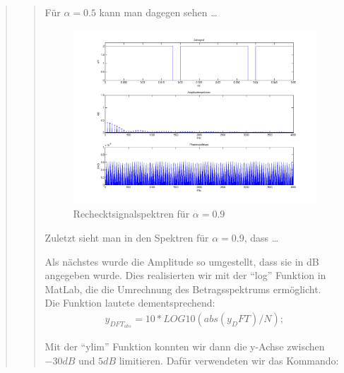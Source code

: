 \begin{quote}
\begin{quote}
		Für $\alpha = 0.5$ kann man dagegen sehen \ldots
		
		
		\begin{center}
	           \begin{figure}[H]
    			\centering
    				\includegraphics[scale=0.5]{recht_alpha9.png}
    			\caption{Rechecktsignalspektren für $\alpha = 0.9$}		
    			\end{figure}
		\end{center}
		
		Zuletzt sieht man in den Spektren für $\alpha = 0.9$, dass \ldots
		
		\vspace{1em}
		
		Als nächstes wurde die Amplitude so umgestellt, dass sie in dB angegeben
		wurde. Dies realisierten wir mit der ``log'' Funktion in MatLab, die die
		Umrechnung des Betragsspektrums ermöglicht.\\
		Die Funktion lautete dementsprechend:\\
		
        \begin{equation*}
        	\begin{split}
                y_{DFT}_{abs} = 10*LOG10(abs(y_DFT)/N);		
        	\end{split}
        \end{equation*}

		Mit der ``ylim'' Funktion konnten wir dann die y-Achse zwischen $-30 dB$
		und $5 dB$ limitieren. Dafür verwendeten wir das Kommando:\\
		
		\begin{center}
		

\end{center}
\end{quote}
\end{quote}
